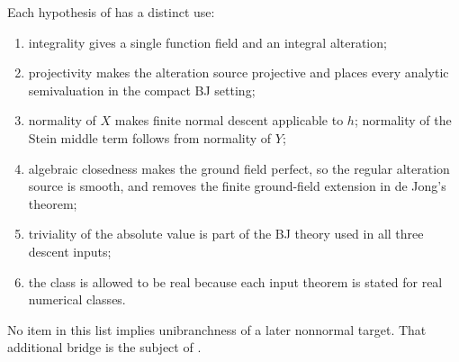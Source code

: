 \begin{proposition}\label{prop:bj-alteration-hypothesis-audit}
Each hypothesis of  has a distinct use:
\begin{enumerate}
\item integrality gives a single function field and an integral alteration;
\item projectivity makes the alteration source projective and places every
      analytic semivaluation in the compact BJ setting;
\item normality of $X$ makes finite normal descent applicable to $h$;
      normality of the Stein middle term follows from normality of $Y$;
\item algebraic closedness makes the ground field perfect, so the regular
      alteration source is smooth, and removes the finite ground-field
      extension in de Jong's theorem;
\item triviality of the absolute value is part of the BJ theory used in all
      three descent inputs;
\item the class is allowed to be real because each input theorem is stated for
      real numerical classes.
\end{enumerate}
No item in this list implies unibranchness of a later nonnormal target.
That additional bridge is the subject of
.
\end{proposition}

